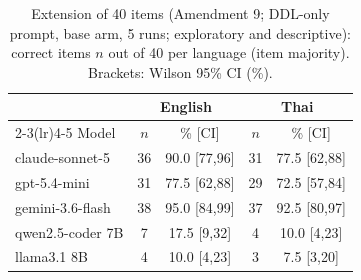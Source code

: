 \begin{table}[t]
\caption{Extension of 40 items (Amendment 9; DDL-only prompt, base arm, 5 runs;
exploratory and descriptive): correct items $n$ out of 40 per language
(item majority). Brackets: Wilson 95\% CI (\%).}
\label{tab:extension}
\centering\footnotesize\setlength{\tabcolsep}{3.5pt}
\begin{tabular}{lcccc}
\toprule
 & \multicolumn{2}{c}{English} & \multicolumn{2}{c}{Thai} \\
\cmidrule(lr){2-3}\cmidrule(lr){4-5}
Model & $n$ & \% [CI] & $n$ & \% [CI] \\
\midrule
claude-sonnet-5 & 36 & 90.0 [77,96] & 31 & 77.5 [62,88] \\
gpt-5.4-mini & 31 & 77.5 [62,88] & 29 & 72.5 [57,84] \\
gemini-3.6-flash & 38 & 95.0 [84,99] & 37 & 92.5 [80,97] \\
qwen2.5-coder 7B & 7 & 17.5 [9,32] & 4 & 10.0 [4,23] \\
llama3.1 8B & 4 & 10.0 [4,23] & 3 & 7.5 [3,20] \\
\bottomrule
\end{tabular}
\end{table}

